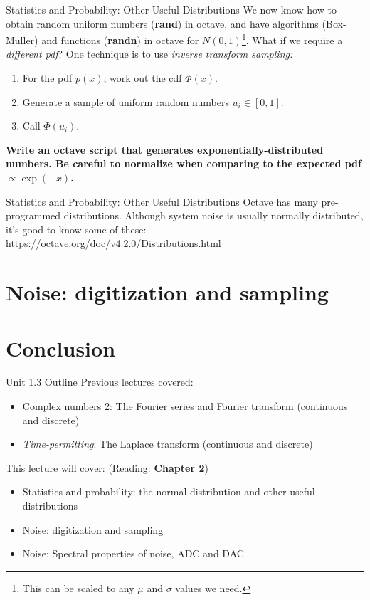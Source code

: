 \documentclass{beamer}
\begin{document}
\begin{frame}[fragile]{Statistics and Probability: Other Useful Distributions}
\small
We now know how to obtain random uniform numbers (\textbf{rand}) in octave, and have algorithms (Box-Muller) and functions (\textbf{randn}) in octave for $N(0,1)$\footnote{This can be scaled to any $\mu$ and $\sigma$ values we need.}.  What if we require a \textit{different pdf}?  One technique is to use \textit{inverse transform sampling:}
\begin{enumerate}
\item For the pdf $p(x)$, work out the cdf $\Phi(x)$.
\item Generate a sample of uniform random numbers $u_i \in [0,1]$.
\item Call $\Phi(u_i)$.
\end{enumerate}
\textbf{Write an octave script that generates exponentially-distributed numbers.  Be careful to normalize when comparing to the expected pdf $\propto \exp(-x)$.}
\end{frame}

\begin{frame}[fragile]{Statistics and Probability: Other Useful Distributions}
\small
Octave has many pre-programmed distributions.  Although system noise is usually normally distributed, it's good to know some of these: \\ \vspace{0.5cm}
\url{https://octave.org/doc/v4.2.0/Distributions.html}
\end{frame}

\section{Noise: digitization and sampling}

\section{Conclusion}

\begin{frame}{Unit 1.3 Outline}
Previous lectures covered:
\begin{itemize}
\item Complex numbers 2: The Fourier series and Fourier transform (continuous and discrete)
\item \textit{Time-permitting}: The Laplace transform (continuous and discrete)
\end{itemize}
This lecture will cover: (Reading: \textbf{Chapter 2})
\begin{itemize}
\item \alert{Statistics and probability: the normal distribution and other useful distributions}
\item \alert{Noise: digitization and sampling}
\item Noise: Spectral properties of noise, ADC and DAC
\end{itemize}
\end{frame}
\end{document}
